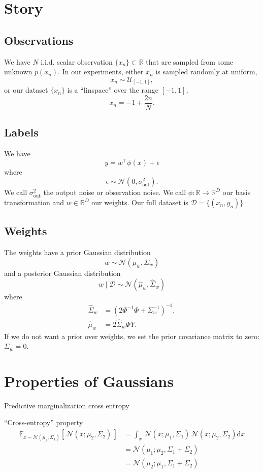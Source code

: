 \documentclass{article}
\begin{document}
  \section*{Story}
  \subsection*{Observations}
  We have $N$ i.i.d. scalar observation $\{x_n\} \subset \mathbb{R}$ that are sampled from some unknown $p(x_n)$. In our experiments, either $x_n$ is sampled randomly at uniform, $$x_n \sim \mathcal{U}_{[-1, 1]},$$ or our dataset $\{x_n\}$ is a ``linspace'' over the range $[-1, 1]$, $$x_n = -1 + \frac{2n}{N}.$$

  \subsection*{Labels}
  We have $$y = w^\top \phi(x) + \epsilon$$ where $$\epsilon \sim \mathcal{N}(0, \sigma_{\mathrm{out}}^2).$$ We call $\sigma_{\mathrm{out}}^2$ the output noise or observation noise. We call $\phi : \mathbb{R} \to \mathbb{R}^D$ our basis transformation and $w \in \mathbb{R}^D$ our weights. Our full dataset is $\mathcal{D} = \{(x_n, y_n) \}$

  \subsection*{Weights}
  The weights have a prior Gaussian distribution $$w \sim \mathcal{N}(\mu_w, \Sigma_w)$$ and a posterior Gaussian distribution $$w \mid \mathcal{D} \sim \mathcal{N}(\hat\mu_w, \hat\Sigma_w)$$ where
  \begin{align*}
    \hat\Sigma_w &= \left(2\Phi^{-1}\Phi + \Sigma_w^{-1}\right)^{-1}, \\
    \hat\mu_w &= 2\hat\Sigma_w \Phi Y.
  \end{align*}
  If we do not want a prior over weights, we set the prior covariance matrix to zero: $\Sigma_w = 0$.



  \section*{Properties of Gaussians}
  Predictive marginalization cross entropy


  ``Cross-entropy'' property
  \begin{align*}
    \mathbb{E}_{x \sim \mathcal{N}(\mu_1, \Sigma_1)}[\,\mathcal{N}(x; \mu_2, \Sigma_2)\,] &= \int_x \,\mathcal{N}(x; \mu_1, \Sigma_1) \, \mathcal{N}(x; \mu_2, \Sigma_2)  \mathrm{d}x \\
    &= \mathcal{N}(\mu_1; \mu_2, \Sigma_1 + \Sigma_2) \\
    &= \mathcal{N}(\mu_2; \mu_1, \Sigma_1 + \Sigma_2)
  \end{align*}
\end{document}
